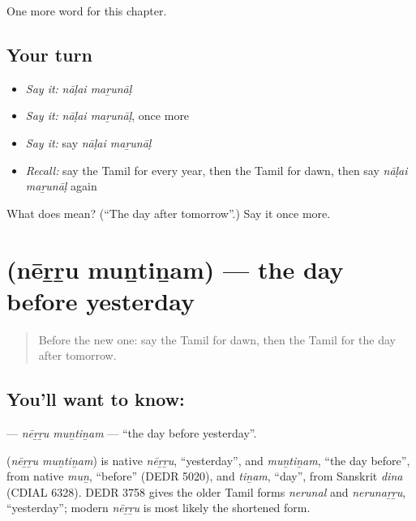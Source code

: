 \begin{grammarlens}[title={What you've built}]
One more word for this chapter.
\end{grammarlens}

\subsection*{Your turn}
\begin{itemize}
\raggedright
  \item \emph{Say it:} \emph{nāḷai maṟunāḷ}
  \item \emph{Say it:} \emph{nāḷai maṟunāḷ}, once more
  \item \emph{Say it:} say \emph{nāḷai maṟunāḷ}
  \item \emph{Recall:} say the Tamil for every year, then the Tamil for dawn, then say \emph{nāḷai maṟunāḷ} again
\end{itemize}

\begin{tcolorbox}[breakable,colback=teal!4,colframe=teal!35!black,title={Before you move on}]
What does   mean? (\textquotedblleft{}The day after tomorrow\textquotedblright{}.) Say it once more.
\end{tcolorbox}
\section[\texorpdfstring{\ta{நேற்று} \ta{முன்தினம்} (nēṟṟu muṉtiṉam)}{நேற்று முன்தினம் (nēṟṟu muṉtiṉam)}]{  (nēṟṟu muṉtiṉam) — the day before yesterday}

\label{lesson:TA-C233-nerru-muntinam}



\begin{quote}
Before the new one: say the Tamil for dawn, then the Tamil for the day after tomorrow.
\end{quote}

\subsection*{You'll want to know:  }
\textbf{ } — \emph{nēṟṟu muṉtiṉam} — \textquotedblleft{}the day before yesterday\textquotedblright{}.

\begin{cousinweb}
\textbf{ } (\emph{nēṟṟu muṉtiṉam}) is native \emph{nēṟṟu}, \textquotedblleft{}yesterday\textquotedblright{}, and \emph{muṉtiṉam}, \textquotedblleft{}the day before\textquotedblright{}, from native \emph{muṉ}, \textquotedblleft{}before\textquotedblright{} (DEDR 5020), and \emph{tiṉam}, \textquotedblleft{}day\textquotedblright{}, from Sanskrit \emph{dina} (CDIAL 6328). DEDR 3758 gives the older Tamil forms \emph{nerunal} and \emph{nerunaṟṟu}, \textquotedblleft{}yesterday\textquotedblright{}; modern \emph{nēṟṟu} is most likely the shortened form.
\end{cousinweb}

